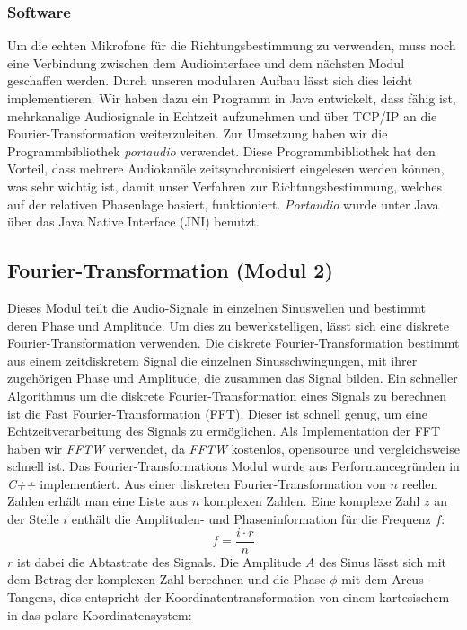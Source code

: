 \subsubsection{Software}
Um die echten Mikrofone für die Richtungsbestimmung zu verwenden, muss noch eine Verbindung zwischen dem Audiointerface und dem nächsten Modul geschaffen werden. Durch unseren modularen Aufbau lässt sich dies leicht implementieren. Wir haben dazu ein Programm in Java entwickelt, dass fähig ist, mehrkanalige Audiosignale in Echtzeit aufzunehmen und über TCP/IP an die Fourier-Transformation weiterzuleiten. Zur Umsetzung haben wir die Programmbibliothek \textit{portaudio} \cite{portaudio} verwendet. Diese Programmbibliothek hat den Vorteil, dass mehrere Audiokanäle zeitsynchronisiert eingelesen werden können, was sehr wichtig ist, damit unser Verfahren zur Richtungsbestimmung, welches auf der relativen Phasenlage basiert, funktioniert. \textit{Portaudio} wurde unter Java über das Java Native Interface (JNI) benutzt.

\subsection{Fourier-Transformation (Modul 2)}
Dieses Modul teilt die Audio-Signale in einzelnen Sinuswellen und bestimmt deren Phase und Amplitude. Um dies zu bewerkstelligen, lässt sich eine diskrete Fourier-Transformation verwenden. Die diskrete Fourier-Transformation bestimmt aus einem zeitdiskretem Signal die einzelnen Sinusschwingungen, mit ihrer zugehörigen Phase und Amplitude, die zusammen das Signal bilden. Ein schneller Algorithmus um die diskrete Fourier-Transformation eines Signals zu berechnen ist die Fast Fourier-Transformation (FFT). Dieser ist schnell genug, um eine Echtzeitverarbeitung des Signals zu ermöglichen. Als Implementation der FFT haben wir \textit{FFTW}\cite{FFTW} verwendet, da \textit{FFTW} kostenlos, opensource und vergleichsweise schnell ist.
Das Fourier-Transformations Modul wurde aus Performancegründen in \textit{C++} implementiert.
Aus einer diskreten Fourier-Transformation von $n$ reellen Zahlen erhält man eine Liste aus $n$ komplexen Zahlen. Eine komplexe Zahl $z$ an der Stelle $i$ enthält die Amplituden- und Phaseninformation für die Frequenz $f$:
$$
f = \frac{i\cdot r}{n}
$$
$r$ ist dabei die Abtastrate des Signals. Die Amplitude $A$ des Sinus lässt sich mit dem Betrag der komplexen Zahl berechnen und die Phase $\phi$ mit dem Arcus-Tangens, dies entspricht der Koordinatentransformation von einem kartesischem in das polare Koordinatensystem:

